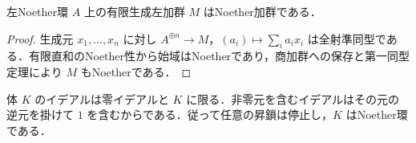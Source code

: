 \begin{prop}[Noether環上の有限生成加群]
左Noether環 $A$ 上の有限生成左加群 $M$ はNoether加群である．
\end{prop}
\begin{proof}
生成元 $x_1,\ldots,x_n$ に対し $A^{\oplus n}\to M$，$(a_i)\mapsto\sum_i a_ix_i$ は全射準同型である．有限直和のNoether性から始域はNoetherであり，商加群への保存と第一同型定理により $M$ もNoetherである．
\end{proof}
\begin{prop}[体自身のNoether性]
体 $K$ のイデアルは零イデアルと $K$ に限る．非零元を含むイデアルはその元の逆元を掛けて $1$ を含むからである．従って任意の昇鎖は停止し，$K$ はNoether環である．
\end{prop}
